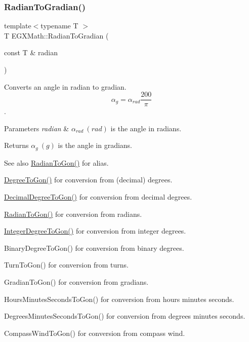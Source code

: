 \subsubsection{\texorpdfstring{Radian\+To\+Gradian()}{RadianToGradian()}}
{\footnotesize\ttfamily template$<$typename T $>$ \\
T E\+G\+X\+Math\+::\+Radian\+To\+Gradian (\begin{DoxyParamCaption}\item[{const T \&}]{radian }\end{DoxyParamCaption})}



Converts an angle in radian to gradian. \[\alpha_{g}=\alpha_{rad}\frac{200}{\pi}\]. 


\begin{DoxyParams}{Parameters}
{\em radian} & $\alpha_{rad}\ (rad)$ is the angle in radians. \\
\hline
\end{DoxyParams}
\begin{DoxyReturn}{Returns}
$\alpha_{g}\ (g)$ is the angle in gradians. 
\end{DoxyReturn}
\begin{DoxySeeAlso}{See also}
\mbox{\hyperlink{group___e_g_x_math-_angle_conversions-_radian_ga36912e5a810b64c271c4dafc17f4ca45}{Radian\+To\+Gon()}} for alias. 

\mbox{\hyperlink{group___e_g_x_math-_angle_conversions-_degree_ga87c3fab0867021e5d2501197b4db6194}{Degree\+To\+Gon()}} for conversion from (decimal) degrees. 

\mbox{\hyperlink{group___e_g_x_math-_angle_conversions-_decimal_degree_gaeb333a1ad0aeb913c025fbd1be85fcb3}{Decimal\+Degree\+To\+Gon()}} for conversion from decimal degrees. 

\mbox{\hyperlink{group___e_g_x_math-_angle_conversions-_radian_ga36912e5a810b64c271c4dafc17f4ca45}{Radian\+To\+Gon()}} for conversion from radians. 

\mbox{\hyperlink{group___e_g_x_math-_angle_conversions-_integer_degree_ga6e5be425c37ad27319f09329156c64bb}{Integer\+Degree\+To\+Gon()}} for conversion from integer degrees. 

Binary\+Degree\+To\+Gon() for conversion from binary degrees. 

Turn\+To\+Gon() for conversion from turns. 

Gradian\+To\+Gon() for conversion from gradians. 

Hours\+Minutes\+Seconds\+To\+Gon() for conversion from hours minutes seconds. 

Degrees\+Minutes\+Seconds\+To\+Gon() for conversion from degrees minutes seconds. 

Compass\+Wind\+To\+Gon() for conversion from compass wind. 
\end{DoxySeeAlso}
\mbox{\label{group___e_g_x_math-_angle_conversions-_radian_ga55b5fba9307f34ab8db57391789a90cc}} 
